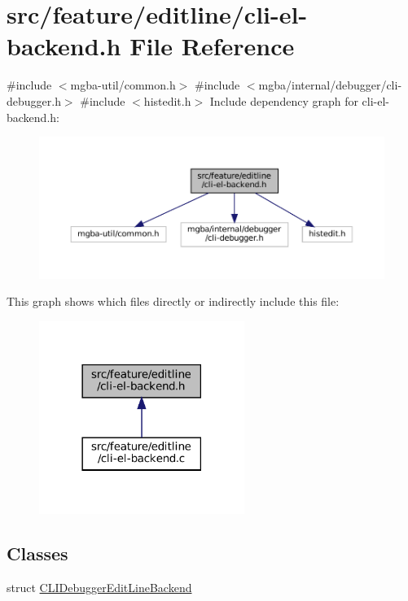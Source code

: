 \hypertarget{cli-el-backend_8h}{}\section{src/feature/editline/cli-\/el-\/backend.h File Reference}
\label{cli-el-backend_8h}
{\ttfamily \#include $<$mgba-\/util/common.\+h$>$}\newline
{\ttfamily \#include $<$mgba/internal/debugger/cli-\/debugger.\+h$>$}\newline
{\ttfamily \#include $<$histedit.\+h$>$}\newline
Include dependency graph for cli-\/el-\/backend.h\+:
\nopagebreak
\begin{figure}[H]
\begin{center}
\leavevmode
\includegraphics[width=350pt]{cli-el-backend_8h__incl}
\end{center}
\end{figure}
This graph shows which files directly or indirectly include this file\+:
\nopagebreak
\begin{figure}[H]
\begin{center}
\leavevmode
\includegraphics[width=189pt]{cli-el-backend_8h__dep__incl}
\end{center}
\end{figure}
\subsection*{Classes}
\begin{DoxyCompactItemize}
\item 
struct \mbox{\hyperlink{cli-el-backend_8h_struct_c_l_i_debugger_edit_line_backend}{C\+L\+I\+Debugger\+Edit\+Line\+Backend}}
\end{DoxyCompactItemize}
